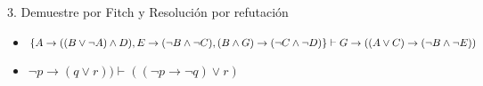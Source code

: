 \documentclass{article}
\begin{document}
3. Demuestre por Fitch y Resoluci\'on por refutaci\'on

\begin{itemize}

	\item $\{A \rightarrow (( B \lor \neg A) \land D), E \rightarrow (\neg B \land \neg C), (B \land G) \rightarrow (\neg C \land \neg D)\} \\ \vdash G  \rightarrow ((A \lor C) \rightarrow ( \neg B \land \neg E))$
	
	\item  $\neg p \rightarrow (q \lor r)) \vdash ((\neg p \rightarrow \neg q) \lor r)$ 
	
\end{itemize}

\begin{prooftree}
\end{prooftree}
\end{document}
